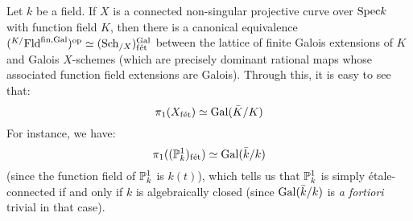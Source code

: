             \begin{example} \label{example: etale_fundamental_group_of_a_curve}
                Let $k$ be a field. If $X$ is a connected non-singular projective curve over $\Spec k$ with function field $K$, then there is a canonical equivalence $({}^{K/}\Fld^{\fin, \Gal})^{\op} \cong (\Sch_{/X})_{\fet}^{\Gal}$ between the lattice of finite Galois extensions of $K$ and Galois $X$-schemes (which are precisely dominant rational maps whose associated function field extensions are Galois). Through this, it is easy to see that:
                    $$\pi_1(X_{\fet}) \cong \Gal(\bar{K}/K)$$
                For instance, we have:
                    $$\pi_1((\P^1_k)_{\fet}) \cong \Gal(\bar{k}/k)$$
                (since the function field of $\P^1_k$ is $k(t)$), which tells us that $\P^1_k$ is simply \'etale-connected if and only if $k$ is algebraically closed (since $\Gal(\bar{k}/k)$ is \textit{a fortiori} trivial in that case). 
                

\end{example}
